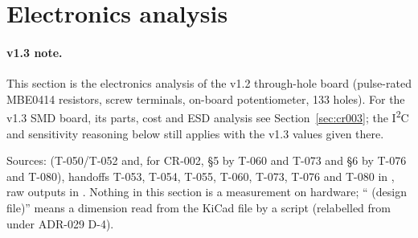 \section{Electronics analysis}
\label{sec:electronics}

\paragraph{v1.3 note.} This section is the electronics analysis of the v1.2
through-hole board (pulse-rated MBE0414 resistors, screw terminals, on-board
potentiometer, 133 holes). For the v1.3 SMD board, its parts, cost and ESD analysis
see Section~\ref{sec:cr003}; the I\textsuperscript{2}C and sensitivity reasoning
below still applies with the v1.3 values given there.

Sources:  (T-050/T-052 and, for CR-002, \S5 by
T-060 and T-073 and \S6 by T-076 and T-080), handoffs T-053, T-054, T-055, T-060,
T-073, T-076 and T-080 in
, raw outputs in
. Nothing in this section is a measurement on hardware;
`` (design file)'' means a dimension read from the KiCad file by a
script (relabelled from  under ADR-029 D-4).

